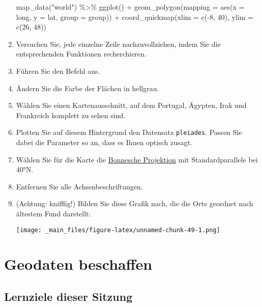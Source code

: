\documentclass[11pt,german,a4paper]{article}
\newenvironment{Shaded}{\begin{snugshade}}{\end{snugshade}}
\newcommand{\AttributeTok}[1]{\textcolor[rgb]{0.77,0.63,0.00}{#1}}
\newcommand{\DecValTok}[1]{\textcolor[rgb]{0.00,0.00,0.81}{#1}}
\newcommand{\FunctionTok}[1]{\textcolor[rgb]{0.00,0.00,0.00}{#1}}
\newcommand{\NormalTok}[1]{#1}
\newcommand{\SpecialCharTok}[1]{\textcolor[rgb]{0.00,0.00,0.00}{#1}}
\newcommand{\StringTok}[1]{\textcolor[rgb]{0.31,0.60,0.02}{#1}}
\begin{document}
\begin{enumerate}
\begin{Shaded}
\begin{Highlighting}[]
\FunctionTok{map\_data}\NormalTok{(}\StringTok{"world"}\NormalTok{) }\SpecialCharTok{\%\textgreater{}\%}
  \FunctionTok{ggplot}\NormalTok{() }\SpecialCharTok{+}
    \FunctionTok{geom\_polygon}\NormalTok{(}\AttributeTok{mapping =} \FunctionTok{aes}\NormalTok{(}\AttributeTok{x =}\NormalTok{ long,}
                               \AttributeTok{y =}\NormalTok{ lat,}
                               \AttributeTok{group =}\NormalTok{ group)) }\SpecialCharTok{+}
    \FunctionTok{coord\_quickmap}\NormalTok{(}\AttributeTok{xlim =} \FunctionTok{c}\NormalTok{(}\SpecialCharTok{{-}}\DecValTok{8}\NormalTok{, }\DecValTok{40}\NormalTok{),}
                   \AttributeTok{ylim =} \FunctionTok{c}\NormalTok{(}\DecValTok{26}\NormalTok{, }\DecValTok{48}\NormalTok{))}
\end{Highlighting}
\end{Shaded}
\item
  Versuchen Sie, jede einzelne Zeile nachzuvollziehen, indem Sie die entsprechenden Funktionen recherchieren.
\item
  Führen Sie den Befehl aus.
\item
  Ändern Sie die Farbe der Flächen in hellgrau.
\item
  Wählen Sie einen Kartenausschnitt, auf dem Portugal, Ägypten, Irak und Frankreich komplett zu sehen sind.
\item
  Plotten Sie auf diesem Hintergrund den Datensatz \texttt{pleiades}. Passen Sie dabei die Parameter so an, dass es Ihnen optisch zusagt.
\item
  Wählen Sie für die Karte die \href{https://de.wikipedia.org/wiki/Bonnesche_Projektion}{Bonnesche Projektion} mit Standardparallele bei 40°N.
\item
  Entfernen Sie alle Achsenbeschriftungen.
\item
  (Achtung: knifflig!) Bilden Sie diese Grafik nach, die die Orte geordnet nach ältestem Fund darstellt:

  \texttt{[image: \_main\_files/figure-latex/unnamed-chunk-49-1.png]}
\end{enumerate}

\hypertarget{geodaten-beschaffen}{%
\section{Geodaten beschaffen}\label{geodaten-beschaffen}}

\hypertarget{lernziele-dieser-sitzung-2}{%
\subsection{Lernziele dieser Sitzung}\label{lernziele-dieser-sitzung-2}}
\end{document}
